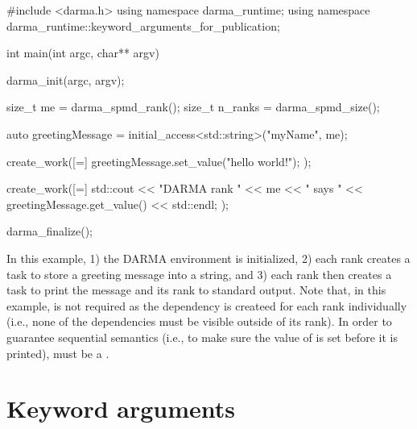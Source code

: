 


\begin{CppCode}
#include <darma.h>
using namespace darma_runtime;
using namespace darma_runtime::keyword_arguments_for_publication;

int main(int argc, char** argv) {

  darma_init(argc, argv);

  size_t me = darma_spmd_rank();
  size_t n_ranks = darma_spmd_size();

  auto greetingMessage = initial_access<std::string>("myName", me);

  create_work([=]
  {
    greetingMessage.set_value("hello world!");
  });

  create_work([=]
  {
    std::cout << "DARMA rank " << me << " says " 
              << greetingMessage.get_value() << std::endl;
  });

  darma_finalize();

}
\end{CppCode}

In this example, 1) the DARMA environment is initialized, 2) each rank creates a
task to store a greeting message into a string, and 3) each rank then creates a
task to print the message and its rank to standard output.
Note that, in this example,  is not required as the
dependency  is createed for each rank individually
(i.e., none of the dependencies must be visible outside of its rank).
In order to guarantee \gls{sequential semantics} (i.e., to make sure the value
of  is set before it is printed),
 must be a .


\section{Keyword arguments}
\label{sec:keyword}


